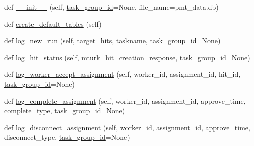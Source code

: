 \begin{DoxyCompactItemize}
\item 
def \hyperlink{classparlai_1_1mturk_1_1core_1_1legacy__2018_1_1mturk__data__handler_1_1MTurkDataHandler_a29c63ed977f51176d78bffe42f5d21fe}{\+\_\+\+\_\+init\+\_\+\+\_\+} (self, \hyperlink{classparlai_1_1mturk_1_1core_1_1legacy__2018_1_1mturk__data__handler_1_1MTurkDataHandler_ab743471dc641c785f93d9c1285967162}{task\+\_\+group\+\_\+id}=None, file\+\_\+name=\textquotesingle{}pmt\+\_\+data.\+db\textquotesingle{})
\item 
def \hyperlink{classparlai_1_1mturk_1_1core_1_1legacy__2018_1_1mturk__data__handler_1_1MTurkDataHandler_ab2c424e19bb6a0cb664de78869df362a}{create\+\_\+default\+\_\+tables} (self)
\item 
def \hyperlink{classparlai_1_1mturk_1_1core_1_1legacy__2018_1_1mturk__data__handler_1_1MTurkDataHandler_a0bc9f338e92aa4c1dc7a0f09e743b01e}{log\+\_\+new\+\_\+run} (self, target\+\_\+hits, taskname, \hyperlink{classparlai_1_1mturk_1_1core_1_1legacy__2018_1_1mturk__data__handler_1_1MTurkDataHandler_ab743471dc641c785f93d9c1285967162}{task\+\_\+group\+\_\+id}=None)
\item 
def \hyperlink{classparlai_1_1mturk_1_1core_1_1legacy__2018_1_1mturk__data__handler_1_1MTurkDataHandler_a1b7db2687208e1af513fa590a6380779}{log\+\_\+hit\+\_\+status} (self, mturk\+\_\+hit\+\_\+creation\+\_\+response, \hyperlink{classparlai_1_1mturk_1_1core_1_1legacy__2018_1_1mturk__data__handler_1_1MTurkDataHandler_ab743471dc641c785f93d9c1285967162}{task\+\_\+group\+\_\+id}=None)
\item 
def \hyperlink{classparlai_1_1mturk_1_1core_1_1legacy__2018_1_1mturk__data__handler_1_1MTurkDataHandler_ac38ddedd0a8efa4e833a502e8d2860c6}{log\+\_\+worker\+\_\+accept\+\_\+assignment} (self, worker\+\_\+id, assignment\+\_\+id, hit\+\_\+id, \hyperlink{classparlai_1_1mturk_1_1core_1_1legacy__2018_1_1mturk__data__handler_1_1MTurkDataHandler_ab743471dc641c785f93d9c1285967162}{task\+\_\+group\+\_\+id}=None)
\item 
def \hyperlink{classparlai_1_1mturk_1_1core_1_1legacy__2018_1_1mturk__data__handler_1_1MTurkDataHandler_af086a3896a105801c66195efc8f95c03}{log\+\_\+complete\+\_\+assignment} (self, worker\+\_\+id, assignment\+\_\+id, approve\+\_\+time, complete\+\_\+type, \hyperlink{classparlai_1_1mturk_1_1core_1_1legacy__2018_1_1mturk__data__handler_1_1MTurkDataHandler_ab743471dc641c785f93d9c1285967162}{task\+\_\+group\+\_\+id}=None)
\item 
def \hyperlink{classparlai_1_1mturk_1_1core_1_1legacy__2018_1_1mturk__data__handler_1_1MTurkDataHandler_a79e0ff8d37c8df05b532a38f6eddb1e5}{log\+\_\+disconnect\+\_\+assignment} (self, worker\+\_\+id, assignment\+\_\+id, approve\+\_\+time, disconnect\+\_\+type, \hyperlink{classparlai_1_1mturk_1_1core_1_1legacy__2018_1_1mturk__data__handler_1_1MTurkDataHandler_ab743471dc641c785f93d9c1285967162}{task\+\_\+group\+\_\+id}=None)

\end{DoxyCompactItemize}
